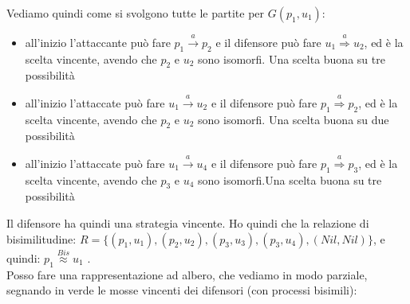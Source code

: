 Vediamo quindi come si svolgono tutte le partite per $G(p_1,u_1)$:
\begin{itemize}
    \item all'inizio l'attaccante può fare $p_1\stackrel{a}{\rightarrow}p_2$ e il difensore può fare $u_1\stackrel{a}{\Rightarrow}u_2$, ed è la scelta vincente, avendo che $p_2$ e $u_2$ sono isomorfi. Una scelta buona su tre possibilità
    \item all'inizio l'attaccate può fare $u_1\stackrel{a}{\rightarrow}u_2$ e il difensore può fare $p_1\stackrel{a}{\Rightarrow}p_2$, ed è la scelta vincente, avendo che $p_2$ e $u_2$ sono isomorfi. Una scelta buona su due possibilità
    \item all'inizio l'attaccate può fare $u_1\stackrel{a}{\rightarrow}u_4$ e il difensore può fare $p_1\stackrel{a}{\Rightarrow}p_3$, ed è la scelta vincente, avendo che $p_3$ e $u_4$ sono isomorfi.Una scelta buona su tre possibilità
\end{itemize}
Il difensore ha quindi una strategia vincente.
Ho quindi che la relazione di bisimilitudine: $R=\{(p_1,u_1),(p_2,u_2),(p_3,u_3),(p_3,u_4),(Nil,Nil)\}$, e quindi: $p_1\stackrel{Bis}{\approx}u_1$ . \\
Posso fare una rappresentazione ad albero, che vediamo in modo parziale, segnando in verde le mosse vincenti dei difensori (con processi bisimili):
\begin{center}
\end{center}

